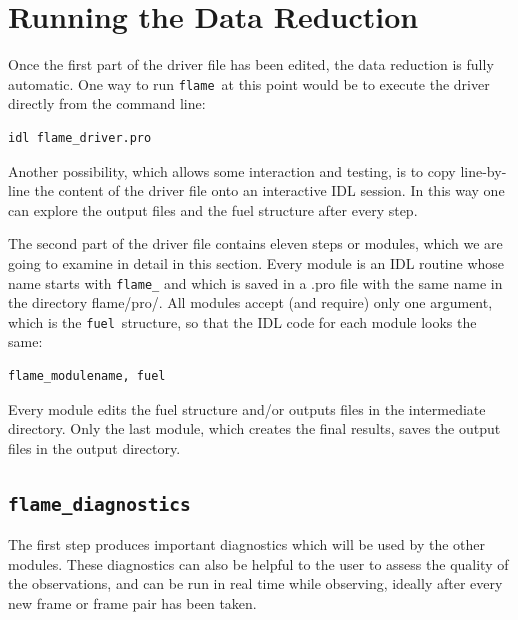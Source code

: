 \documentclass[a4paper, notitlepage]{article}
\newcommand{\flame}{\texttt{flame}}
\newcommand{\fuel}{\texttt{fuel}}
\begin{document}



\section{Running the Data Reduction}

Once the first part of the driver file has been edited, the data reduction is fully automatic. One way to run \flame\ at this point would be to execute the driver directly from the command line:
\begin{lstlisting}
idl flame_driver.pro
\end{lstlisting}
Another possibility, which allows some interaction and testing, is to copy line-by-line the content of the driver file onto an interactive IDL session. In this way one can explore the output files and the fuel structure after every step.

The second part of the driver file contains eleven steps or modules, which we are going to examine in detail in this section. Every module is an IDL routine whose name starts with \texttt{flame\_} and which is saved in a .pro file with the same name in the directory flame/pro/. All modules accept (and require) only one argument, which is the \fuel\ structure, so that the IDL code for each module looks the same:
\begin{lstlisting}
flame_modulename, fuel
\end{lstlisting}

Every module edits the fuel structure and/or outputs files in the intermediate directory. Only the last module, which creates the final results, saves the output files in the output directory.



\subsection{\texttt{flame\_diagnostics}}
\label{sec:diagnostics}

The first step produces important diagnostics which will be used by the other modules. These diagnostics can also be helpful to the user to assess the quality of the observations, and can be run in real time while observing, ideally after every new frame or frame pair has been taken.
\end{document}
